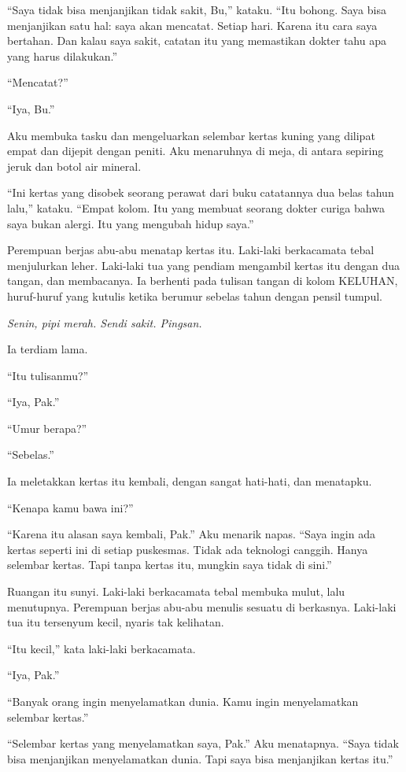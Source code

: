 \documentclass[11pt,twoside,openany]{book}
\begin{document}
``Saya tidak bisa menjanjikan tidak sakit, Bu,'' kataku. ``Itu bohong. Saya bisa menjanjikan satu hal: saya akan mencatat. Setiap hari. Karena itu cara saya bertahan. Dan kalau saya sakit, catatan itu yang memastikan dokter tahu apa yang harus dilakukan.''

``Mencatat?''

``Iya, Bu.''

Aku membuka tasku dan mengeluarkan selembar kertas kuning yang dilipat empat dan dijepit dengan peniti. Aku menaruhnya di meja, di antara sepiring jeruk dan botol air mineral.

``Ini kertas yang disobek seorang perawat dari buku catatannya dua belas tahun lalu,'' kataku. ``Empat kolom. Itu yang membuat seorang dokter curiga bahwa saya bukan alergi. Itu yang mengubah hidup saya.''

Perempuan berjas abu-abu menatap kertas itu. Laki-laki berkacamata tebal menjulurkan leher. Laki-laki tua yang pendiam mengambil kertas itu dengan dua tangan, dan membacanya. Ia berhenti pada tulisan tangan di kolom KELUHAN, huruf-huruf yang kutulis ketika berumur sebelas tahun dengan pensil tumpul.

\emph{Senin, pipi merah. Sendi sakit. Pingsan.}

Ia terdiam lama.

``Itu tulisanmu?''

``Iya, Pak.''

``Umur berapa?''

``Sebelas.''

Ia meletakkan kertas itu kembali, dengan sangat hati-hati, dan menatapku.

``Kenapa kamu bawa ini?''

``Karena itu alasan saya kembali, Pak.'' Aku menarik napas. ``Saya ingin ada kertas seperti ini di setiap puskesmas. Tidak ada teknologi canggih. Hanya selembar kertas. Tapi tanpa kertas itu, mungkin saya tidak di sini.''

Ruangan itu sunyi. Laki-laki berkacamata tebal membuka mulut, lalu menutupnya. Perempuan berjas abu-abu menulis sesuatu di berkasnya. Laki-laki tua itu tersenyum kecil, nyaris tak kelihatan.

``Itu kecil,'' kata laki-laki berkacamata.

``Iya, Pak.''

``Banyak orang ingin menyelamatkan dunia. Kamu ingin menyelamatkan selembar kertas.''

``Selembar kertas yang menyelamatkan saya, Pak.'' Aku menatapnya. ``Saya tidak bisa menjanjikan menyelamatkan dunia. Tapi saya bisa menjanjikan kertas itu.''
\end{document}
